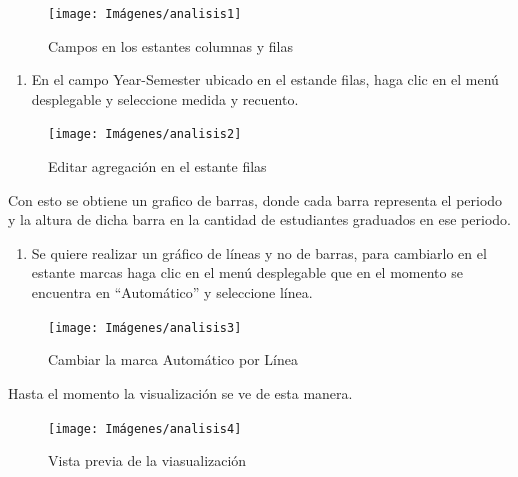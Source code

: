 \documentclass[
]{book}
\providecommand{\tightlist}{%
  \setlength{\itemsep}{0pt}\setlength{\parskip}{0pt}}
\begin{document}
\begin{figure}

{\centering \texttt{[image: Imágenes/analisis1]} 

}

\caption{Campos en los estantes columnas y filas}\label{fig:paso1lineas-fig}
\end{figure}

\begin{enumerate}
\def\labelenumi{\arabic{enumi}.}
\setcounter{enumi}{1}
\tightlist
\item
  En el campo Year-Semester ubicado en el estande filas, haga clic en el menú desplegable y seleccione medida y recuento.
\end{enumerate}

\begin{figure}

{\centering \texttt{[image: Imágenes/analisis2]} 

}

\caption{Editar agregación en el estante filas}\label{fig:paso2lineas-fig}
\end{figure}

Con esto se obtiene un grafico de barras, donde cada barra representa el periodo y la altura de dicha barra en la cantidad de estudiantes graduados en ese periodo.

\begin{enumerate}
\def\labelenumi{\arabic{enumi}.}
\setcounter{enumi}{2}
\tightlist
\item
  Se quiere realizar un gráfico de líneas y no de barras, para cambiarlo en el estante marcas haga clic en el menú desplegable que en el momento se encuentra en ``Automático'' y seleccione línea.
\end{enumerate}

\begin{figure}

{\centering \texttt{[image: Imágenes/analisis3]} 

}

\caption{Cambiar la marca Automático por Línea}\label{fig:paso3lineas-fig}
\end{figure}

Hasta el momento la visualización se ve de esta manera.

\begin{figure}

{\centering \texttt{[image: Imágenes/analisis4]} 

}

\caption{Vista previa de la viasualización}\label{fig:paso3-1lineas-fig}
\end{figure}
\end{document}

